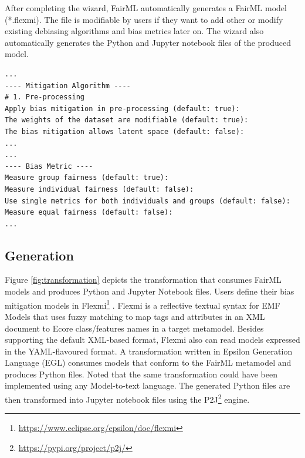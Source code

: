 \documentclass[sigconf,review]{acmart}
\begin{document}
{	After completing the wizard, FairML automatically generates a FairML model (*.flexmi). The file is modifiable by users if they want to add other or modify existing debiasing algorithms and bias metrics later on. The wizard also automatically generates the Python and Jupyter notebook files of the produced model.
	
\begin{lstlisting}[firstnumber=1,style=log,caption={Some the questions asked in the FairML's wizard to assist users to select the best debiasing algorithms and bias metrics.},label=lst:wizard_questions]
...
---- Mitigation Algorithm ----
# 1. Pre-processing
Apply bias mitigation in pre-processing (default: true): 
The weights of the dataset are modifiable (default: true): 
The bias mitigation allows latent space (default: false): 
...
...
---- Bias Metric ----
Measure group fairness (default: true): 
Measure individual fairness (default: false): 
Use single metrics for both individuals and groups (default: false): 
Measure equal fairness (default: false):
... 
\end{lstlisting}
	
	\subsection{Generation}
	\label{sec:generation}
	Figure \ref{fig:transformation} depicts the transformation that consumes FairML models and produces Python and Jupyter Notebook files. 
	Users define their bias mitigation models in Flexmi\footnote{\url{https://www.eclipse.org/epsilon/doc/flexmi}} \cite{dimitris2016flexmi}. 
	Flexmi is a reflective textual syntax for EMF Models \cite{steinberg2009emf} that uses fuzzy matching to map tags and attributes in an XML document to Ecore class/features names \cite{steinberg2009emf} in a target metamodel. Besides supporting the default XML-based format, Flexmi also can read models expressed in the YAML-flavoured format.
	A transformation written in Epsilon Generation Language (EGL) \cite{rose2008egl} consumes models that conform to the FairML metamodel and produces Python files.
	Noted that the same transformation could have been implemented using any Model-to-text language.
	The generated Python files are then transformed into Jupyter notebook files using the P2J\footnote{\url{https://pypi.org/project/p2j/}} engine.
	
}
\end{document}
